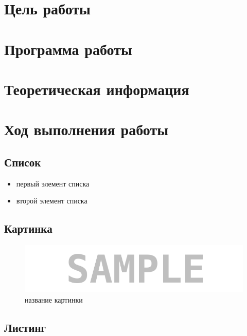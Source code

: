 \vfill %


\tableofcontents
\newpage



\section{Цель работы}


\section{Программа работы}


\section{Теоретическая информация}


\section{Ход выполнения работы}

\subsection{Список}

\begin{itemize}
\item первый элемент списка
\item второй элемент списка
\end{itemize}


\subsection{Картинка}

\begin{figure}[H]
	\begin{center}
		\includegraphics[scale=0.7]{pics/sample}
		\caption{название картинки} 
		\label{pic:pic_name} %
	\end{center}
\end{figure}


\subsection{Листинг}

